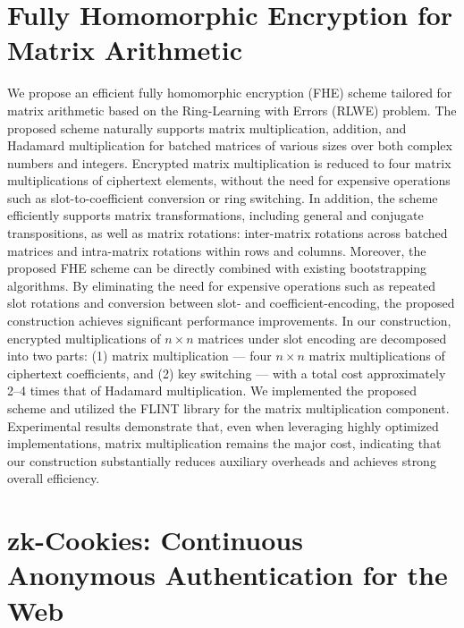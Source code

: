 \documentclass[11pt,oneside]{book}
\theoremstyle{definition}
\theoremstyle{remark}
\theoremstyle{plain}
\begin{document}
\section{\cite{cryptoeprint:2025/1935} Fully Homomorphic Encryption for Matrix Arithmetic}
We propose an efficient fully homomorphic encryption (FHE) scheme tailored for matrix arithmetic based on the Ring-Learning with Errors (RLWE) problem. The proposed scheme naturally supports matrix multiplication, addition, and Hadamard multiplication for batched matrices of various sizes over both complex numbers and integers. Encrypted matrix multiplication is reduced to four matrix multiplications of ciphertext elements, without the need for expensive operations such as slot-to-coefficient conversion or ring switching. In addition, the scheme efficiently supports matrix transformations, including general and conjugate transpositions, as well as matrix rotations: inter-matrix rotations across batched matrices and intra-matrix rotations within rows and columns. Moreover, the proposed FHE scheme can be directly combined with existing bootstrapping algorithms. By eliminating the need for expensive operations such as repeated slot rotations and conversion between slot- and coefficient-encoding, the proposed construction achieves significant performance improvements. In our construction, encrypted multiplications of $n\times n$ matrices under slot encoding are decomposed into two parts: (1) matrix multiplication — four $n\times n$ matrix multiplications of ciphertext coefficients, and (2) key switching — with a total cost approximately 2–4 times that of Hadamard multiplication. We implemented the proposed scheme and utilized the FLINT library for the matrix multiplication component. Experimental results demonstrate that, even when leveraging highly optimized implementations, matrix multiplication remains the major cost, indicating that our construction substantially reduces auxiliary overheads and achieves strong overall efficiency.

\section{\cite{cryptoeprint:2025/1938} zk-Cookies: Continuous Anonymous Authentication for the Web}
\end{document}
